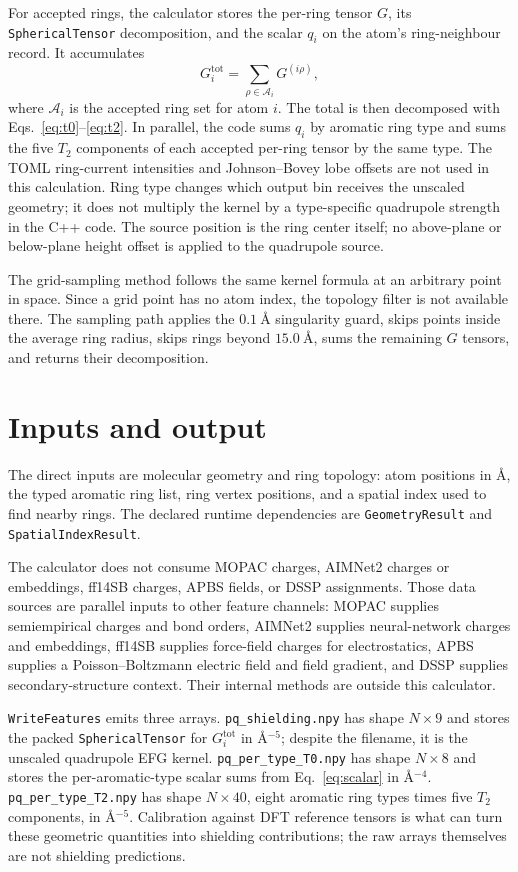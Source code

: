 \documentclass[11pt]{article}
\begin{document}
For accepted rings, the calculator stores the per-ring tensor \(G\), its
\texttt{SphericalTensor} decomposition, and the scalar \(q_i\) on the atom's
ring-neighbour record. It accumulates
\begin{equation}
  G^{\mathrm{tot}}_i = \sum_{\rho\in\mathcal A_i} G^{(i\rho)},
  \label{eq:sum}
\end{equation}
where \(\mathcal A_i\) is the accepted ring set for atom \(i\). The total is
then decomposed with Eqs.~\eqref{eq:t0}--\eqref{eq:t2}. In parallel, the code
sums \(q_i\) by aromatic ring type and sums the five \(T_2\) components of
each accepted per-ring tensor by the same type. The TOML ring-current
intensities and Johnson--Bovey lobe offsets are not used in this calculation.
Ring type changes which output bin receives the unscaled geometry; it does not
multiply the kernel by a type-specific quadrupole strength in the C++ code.
The source position is the ring center itself; no above-plane or below-plane
height offset is applied to the quadrupole source.

The grid-sampling method follows the same kernel formula at an arbitrary point
in space. Since a grid point has no atom index, the topology filter is not
available there. The sampling path applies the \(\SI{0.1}{\angstrom}\)
singularity guard, skips points inside the average ring radius, skips rings
beyond \(\SI{15.0}{\angstrom}\), sums the remaining \(G\) tensors, and returns
their decomposition.

\section{Inputs and output}

The direct inputs are molecular geometry and ring topology: atom positions in
\(\si{\angstrom}\), the typed aromatic ring list, ring vertex positions, and a
spatial index used to find nearby rings. The declared runtime dependencies are
\texttt{GeometryResult} and \texttt{SpatialIndexResult}.

The calculator does not consume MOPAC charges, AIMNet2 charges or embeddings,
ff14SB charges, APBS fields, or DSSP assignments. Those data sources are
parallel inputs to other feature channels: MOPAC supplies semiempirical charges
and bond orders, AIMNet2 supplies neural-network charges and embeddings,
ff14SB supplies force-field charges for electrostatics, APBS supplies a
Poisson--Boltzmann electric field and field gradient, and DSSP supplies
secondary-structure context. Their internal methods are outside this
calculator.

\texttt{WriteFeatures} emits three arrays. \texttt{pq\_shielding.npy} has
shape \(N\times9\) and stores the packed \texttt{SphericalTensor} for
\(G^{\mathrm{tot}}_i\) in \(\si{\angstrom^{-5}}\); despite the filename, it is
the unscaled quadrupole EFG kernel. \texttt{pq\_per\_type\_T0.npy} has shape
\(N\times8\) and stores the per-aromatic-type scalar sums from
Eq.~\eqref{eq:scalar} in \(\si{\angstrom^{-4}}\). \texttt{pq\_per\_type\_T2.npy}
has shape \(N\times40\), eight aromatic ring types times five \(T_2\)
components, in \(\si{\angstrom^{-5}}\). Calibration against DFT reference
tensors is what can turn these geometric quantities into shielding
contributions; the raw arrays themselves are not shielding predictions.
\end{document}
